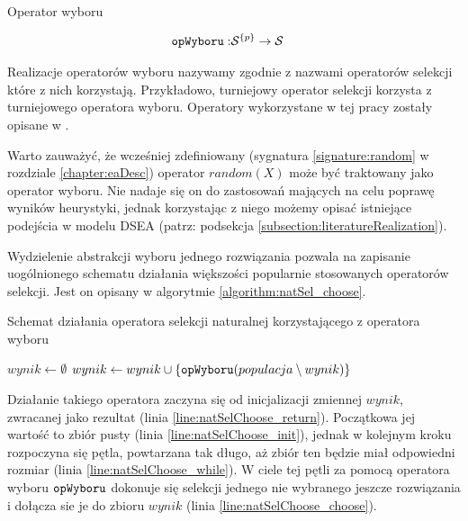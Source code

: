 \documentclass[./FM_mgr.tex]{subfiles}
\begin{document}
\begin{signature}
	\caption{Operator wyboru \label{signature:chooseOp}}
	\begin{align}
	\mathtt{opWyboru}: &{\mathcal{S}}^{ \{ p \}} \rightarrow \mathcal{S}
	\end{align}
\end{signature}

Realizacje operatorów wyboru nazywamy zgodnie z nazwami operatorów selekcji które z nich korzystają.
Przykładowo, turniejowy operator selekcji korzysta z turniejowego operatora wyboru.
Operatory wykorzystane w tej pracy zostały opisane w .

Warto zauważyć, że wcześniej zdefiniowany (sygnatura \ref{signature:random} w rozdziale \ref{chapter:eaDesc}) operator $random(X)$ może być traktowany jako operator wyboru.
Nie nadaje się on do zastosowań mających na celu poprawę wyników heurystyki, jednak korzystając z niego możemy opisać istniejące podejścia w modelu DSEA (patrz: podsekcja \ref{subsection:literatureRealization}).

Wydzielenie abstrakcji wyboru jednego rozwiązania pozwala na zapisanie uogólnionego schematu działania większości popularnie stosowanych operatorów selekcji.
Jest on opisany w algorytmie \ref{algorithm:natSel_choose}.

\begin{algorithm}[h]
	\caption{Schemat działania operatora selekcji naturalnej korzystającego z operatora wyboru \label{algorithm:natSel_choose}}
	\begin{algorithmic}[1]
		\Start
		\Var $wynik \gets \emptyset$ 
		\label{line:natSelChoose_init}
		\label{line:natSelChoose_while}
		\State $wynik \gets wynik \cup \{ \mathtt{opWyboru}(populacja \setminus wynik) \}$
		\label{line:natSelChoose_choose}
		\EndWhile
		\State {}
		\label{line:natSelChoose_return}
		\EndOperator
	\end{algorithmic}
\end{algorithm}

Działanie takiego operatora zaczyna się od inicjalizacji zmiennej $wynik$, zwracanej jako rezultat (linia \ref{line:natSelChoose_return}). 
Początkowa jej wartość to zbiór pusty (linia \ref{line:natSelChoose_init}), jednak w kolejnym kroku rozpoczyna się pętla, powtarzana tak długo, aż zbiór ten będzie miał odpowiedni rozmiar (linia \ref{line:natSelChoose_while}).
W ciele tej pętli za pomocą operatora wyboru $\mathtt{opWyboru}$ dokonuje się selekcji jednego nie wybranego jeszcze rozwiązania i dołącza sie je do zbioru $wynik$ (linia \ref{line:natSelChoose_choose}).
\end{document}
